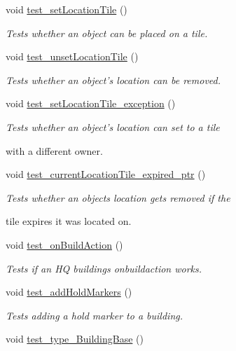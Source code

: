 \begin{DoxyCompactItemize}
void \hyperlink{classdefault__building_a245adf65bac29aacae6c9f148796157d}{test\-\_\-set\-Location\-Tile} ()
\begin{DoxyCompactList}\small\item\em Tests whether an object can be placed on a tile. \end{DoxyCompactList}\item 
void \hyperlink{classdefault__building_aa20f013a8a7b29bd639f822dd0ec1c2f}{test\-\_\-unset\-Location\-Tile} ()
\begin{DoxyCompactList}\small\item\em Tests whether an object's location can be removed. \end{DoxyCompactList}\item 
void \hyperlink{classdefault__building_a77f6f2948dcbdeda1c89344b4329750e}{test\-\_\-set\-Location\-Tile\-\_\-exception} ()
\begin{DoxyCompactList}\small\item\em Tests whether an object's location can set to a tile \par
with a different owner. \end{DoxyCompactList}\item 
void \hyperlink{classdefault__building_a32db5769634d9638af97d559d6d8aeae}{test\-\_\-current\-Location\-Tile\-\_\-expired\-\_\-ptr} ()
\begin{DoxyCompactList}\small\item\em Tests whether an objects location gets removed if the \par
tile expires it was located on. \end{DoxyCompactList}\item 
void \hyperlink{classdefault__building_a5f5b01449c756e96a14dc7c18e9c778b}{test\-\_\-on\-Build\-Action} ()
\begin{DoxyCompactList}\small\item\em Tests if an H\-Q buildings onbuildaction works. \end{DoxyCompactList}\item 
void \hyperlink{classdefault__building_ace547d46c2ba480530c50e19fcdf99f9}{test\-\_\-add\-Hold\-Markers} ()
\begin{DoxyCompactList}\small\item\em Tests adding a hold marker to a building. \end{DoxyCompactList}\item 
void \hyperlink{classdefault__building_a37386998dea658666fdd3b271ea12262}{test\-\_\-type\-\_\-\-Building\-Base} ()

\end{DoxyCompactItemize}
